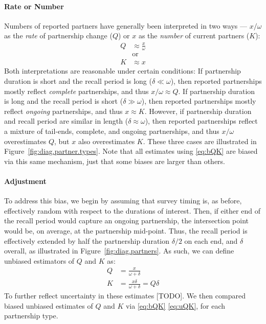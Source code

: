 \paragraph[?]{Rate or Number}
Numbers of reported partners have generally been interpreted in two ways ---
$x/\omega$ as the \emph{rate} of partnership change ($Q$) or
$x$ as the \emph{number} of current partners ($K$):
\begin{subequations}\label{eq:bQK}
\begin{alignat}{1}
  Q &\approx \frac{x}{\omega}\\
    &\text{or} \nonumber\\
  K &\approx x
\end{alignat}
\end{subequations}
Both interpretations are reasonable under certain conditions:
If partnership duration is short and the recall period is long ($\delta \ll \omega$),
then reported partnerships mostly reflect \emph{complete} partnerships,
and thus $x/\omega \approx Q$.
If partnership duration is long and the recall period is short ($\delta \gg \omega$),
then reported partnerships mostly reflect \emph{ongoing} partnerships,
and thus $x \approx K$.
However, if partnership duration and recall period are similar in length ($\delta \approx \omega$),
then reported partnerships reflect a mixture of tail-ends, complete, and ongoing partnerships,
and thus $x/\omega$ overestimates $Q$, but $x$ also overestimates $K$.
These three cases are illustrated in Figure~\ref{fig:diag.partner.types}.
Note that all estimates using \eqref{eq:bQK} are biased via this same mechanism,
just that some biases are larger than others.
\paragraph{Adjustment}
To address this bias, we begin by assuming that survey timing is, as before,
effectively random with respect to the durations of interest.
Then, if either end of the recall period would capture an ongoing partnership,
the intersection point would be, on average, at the partnership mid-point.
Thus, the recall period is effectively extended
by half the partnership duration $\delta/2$ on each end, and $\delta$ overall,
as illustrated in Figure~\ref{fig:diag.partners}.
As such, we can define unbiased estimators of $Q$ and $K$ as:
\begin{subequations}\label{eq:uQK}
\begin{alignat}{1}
  Q &= \frac{x}{\omega + \delta}\\
  K &= \frac{x \delta}{\omega + \delta} = Q \delta
\end{alignat}
\end{subequations}
To further reflect uncertainty in these estimates [TODO].
We then compared biased \vs unbiased estimates of $Q$ and $K$
via \eqref{eq:bQK} \vs \eqref{eq:uQK}, for each partnership type.
